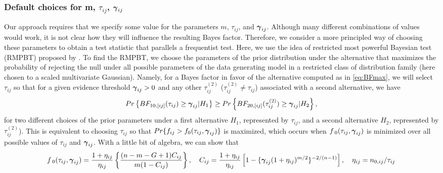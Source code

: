 \documentclass[times,sort&compress,3p]{elsarticle}
\theoremstyle{plain}%
\theoremstyle{definition}
\newcommand{\ugamma}            {\mbox{\boldmath$\gamma$}}
\begin{document}
\subsubsection{Default choices for m, $\tau_{ij}$, $\ugamma_{ij}$} \label{sec:mtaugam}
Our approach requires that we specify some value for the parameters $m$, $\tau_{ij}$, and $\ugamma_{ij}$. Although many different combinations of values would work, it is not clear how they will influence the resulting Bayes factor. Therefore, we consider a more principled way of choosing these parameters to obtain a test statistic that parallels a frequentist test.   
Here, we use the idea of restricted most powerful Bayesian test (RMPBT) proposed by \cite{GoddardJohnson,Goddard}. To find the RMPBT, we choose the parameters of the prior distribution under the alternative that maximizes the probability of rejecting the null under all possible parameters of the data generating model in a restricted class of distribution family (here chosen to a scaled multivariate Gaussian). Namely, for a Bayes factor in favor of the alternative computed as in \eqref{eq:BFmax}, we will select $\tau_{ij}$ so that for a given evidence threshold $\ugamma_{ij} > 0$ and any other $\tau^{(2)}_{ij}$ ($\tau^{(2)}_{ij} \neq \tau_{ij}$) associated with a second alternative, we have
$$Pr\left\{BF_{10,[ij]}(\tau_{ij}) \geq  \ugamma_{ij} | H_{1} \right\} \geq Pr\left\{BF_{20,[ij]}(\tau^{(2)}_{ij}) \geq \ugamma_{ij} | H_{2} \right\},$$
for two different choices of the prior parameters under a first alternative $H_1$, represented by $\tau_{ij}$, and a second alternative $H_2$, represented by $\tau^{(2)}_{ij}$). This is equivalent to choosing $\tau_{ij}$ so that $Pr\{f_{ij} > f_{0}(\tau_{ij},\ugamma_{ij})\}$ is maximized, which occurs when $f_{\;0}(\tau_{ij},\ugamma_{ij})$ is minimized over all possible values of $\tau_{ij}$ and $\ugamma_{ij}$. With a little bit of algebra, we can show that 
\begin{align*}
    f_{\;0}(\tau_{ij},\ugamma_{ij}) = \frac{1+\eta_{ij}}{\eta_{ij}} \left\{ \frac{(n - m -G+1)C_{ij}}{m(1 - C_{ij})} \right\},\quad
    C_{ij} = \frac{1+\eta_{ij}}{\eta_{ij}}\left[ 1 - \{\ugamma_{ij}(1+\eta_{ij})^{m/2} \}^{-2/(n-1)}  \right],\quad\eta_{ij} = n_{0,ij}/\tau_{ij}
\end{align*}
\end{document}
